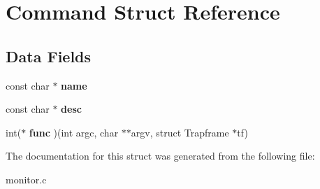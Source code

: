 \hypertarget{structCommand}{}\section{Command Struct Reference}
\label{structCommand}
\subsection*{Data Fields}
\begin{DoxyCompactItemize}
\item 
\mbox{\label{structCommand_aaac7db0461198bc84c6bb01e64ae82e3}} 
const char $\ast$ {\bfseries name}
\item 
\mbox{\label{structCommand_a8b1a2161af48dfcc3f8abac9d1b922fe}} 
const char $\ast$ {\bfseries desc}
\item 
\mbox{\label{structCommand_a37d451748878a78372ce5764e6d38081}} 
int($\ast$ {\bfseries func} )(int argc, char $\ast$$\ast$argv, struct Trapframe $\ast$tf)
\end{DoxyCompactItemize}


The documentation for this struct was generated from the following file\+:\begin{DoxyCompactItemize}
\item 
monitor.\+c\end{DoxyCompactItemize}

